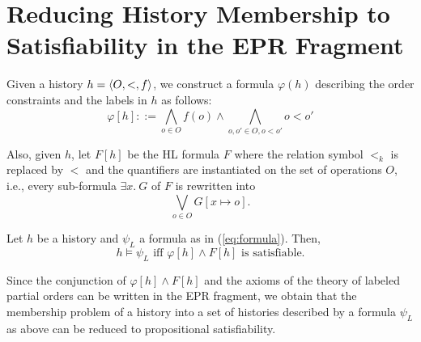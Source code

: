 
\section{Reducing History Membership to Satisfiability in the EPR Fragment}

Given a history $h=\left\langle {O,<,f} \right\rangle$, we construct a formula $\varphi(h)$ describing the order constraints
and the labels in $h$ as follows:
\[
\varphi[h]::= \bigwedge_{o\in O} f(o)\land \bigwedge_{o,o'\in O, o<o'} o< o'
\]

Also, given $h$, let $F[h]$ be the HL formula $F$ where the relation symbol $<_k$ is replaced by $<$
and the quantifiers are instantiated on the set of operations $O$, 
i.e., every sub-formula $\exists x.\ G$ of $F$ is rewritten into
\[
\bigvee_{o\in O} G[x\mapsto o].
\]

\begin{theorem}
Let $h$ be a history and $\psi_L$ a formula as in (\ref{eq:formula}). Then,
\[
h\models \psi_L\mbox{ iff }\varphi[h]\land F[h]\mbox{ is satisfiable.}
\]
\end{theorem}

Since the conjunction of $\varphi[h]\land F[h]$ and the axioms of the theory of 
labeled partial orders can be written in the EPR fragment, we obtain that the
membership problem of a history into a set of histories described by a formula $\psi_L$ as above
can be reduced to propositional satisfiability.